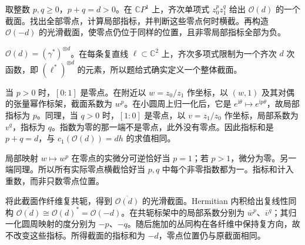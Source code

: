 \BookExercises
\begin{exercise}\label{g2:ex:line-sections-positive-negative-indices}
	取整数 \(p,q\ge0\)，\(p+q=d>0\)。在 \(\mathbb CP^1\) 上，齐次单项式 \(z_0^pz_1^q\) 给出 \(\mathcal O(d)\) 的一个截面。找出全部零点，计算局部指标，并判断这些零点何时横截。再构造 \(\mathcal O(-d)\) 的光滑截面，使零点仍位于同样的位置，且非零局部指标全部为负。
\end{exercise}
\begin{solution}
	\(\mathcal O(d)=(\gamma^*)^{\otimes d}\)。在每条复直线 \(\ell\subset\mathbb C^2\) 上，齐次多项式限制为一个齐次 \(d\) 次函数，即 \((\ell^*)^{\otimes d}\) 的元素，所以题给式确实定义一个整体截面。

	当 \(p>0\) 时，\([0:1]\) 是零点。在附近以 \(w=z_0/z_1\) 作坐标，以 \((w,1)\) 及其对偶的张量幂作标架，截面系数为 \(w^p\)。在小圆周上归一化后，它是 \(e^{\mathrm i\theta}\mapsto e^{\mathrm i p\theta}\)，故局部指标为 \(p\)。同理，当 \(q>0\) 时，\([1:0]\) 是零点，以 \(v=z_1/z_0\) 作坐标，局部系数为 \(v^q\)，指标为 \(q\)。指数为零的那一端不是零点，此外没有零点。因此指标和是 \(p+q=d\)，与 \(c_1(\mathcal O(d))=dh\) 的求值相同。

	局部映射 \(w\mapsto w^p\) 在零点的实微分可逆恰好当 \(p=1\)；若 \(p>1\)，微分为零。另一端同理。所以所有实际零点横截恰好当 \(p,q\) 中每个非零指数都为一。指标和计入重数，而非只数零点位置。

	将此截面作纤维复共轭，得到 \(\overline{\mathcal O(d)}\) 的光滑截面。Hermitian 内积给出复线性同构 \(\overline{\mathcal O(d)}\cong\mathcal O(d)^*=\mathcal O(-d)\)。在共轭标架中的局部系数分别为 \(\overline w^p\)、\(\overline v^q\)；其归一化圆周映射的度分别为 \(-p\)、\(-q\)。随后施加的丛同构在各纤维中保持复方向，故不改变这些指标。所得截面的指标和为 \(-d\)，零点位置仍与原截面相同。
\end{solution}

